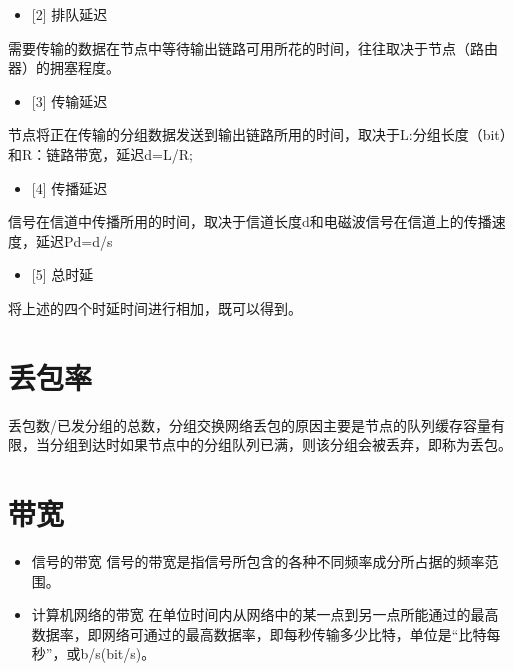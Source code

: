 \begin{itemize}
\item {[2]} 排队延迟

\end{itemize}

需要传输的数据在节点中等待输出链路可用所花的时间，往往取决于节点（路由器）的拥塞程度。

\begin{itemize}
\item {[3]} 传输延迟

\end{itemize}

节点将正在传输的分组数据发送到输出链路所用的时间，取决于L:分组长度（bit）和R：链路带宽，延迟d=L\slash R;

\begin{itemize}
\item {[4]} 传播延迟

\end{itemize}

信号在信道中传播所用的时间，取决于信道长度d和电磁波信号在信道上的传播速度，延迟Pd=d\slash s

\begin{itemize}
\item {[5]} 总时延

\end{itemize}

将上述的四个时延时间进行相加，既可以得到。

\section{丢包率}
\label{丢包率}

丢包数\slash 已发分组的总数，分组交换网络丢包的原因主要是节点的队列缓存容量有限，当分组到达时如果节点中的分组队列已满，则该分组会被丢弃，即称为丢包。

\section{带宽}
\label{带宽}

\begin{itemize}
\item 信号的带宽
信号的带宽是指信号所包含的各种不同频率成分所占据的频率范围。

\item 计算机网络的带宽
在单位时间内从网络中的某一点到另一点所能通过的最高数据率，即网络可通过的最高数据率，即每秒传输多少比特，单位是“比特每秒”，或b\slash s(bit\slash s)。

\end{itemize}

